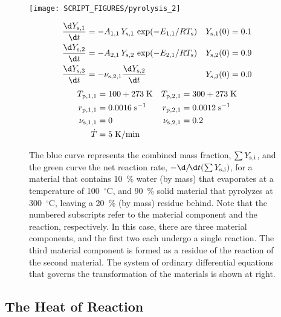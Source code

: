 \documentclass[11pt]{book}
\begin{document}
\begin{figure}[ht]
\noindent
\begin{minipage}{0.5\textwidth}
\texttt{[image: SCRIPT\_FIGURES/pyrolysis\_2]}
\end{minipage}
\hfill
\begin{minipage}{0.5\textwidth}
\footnotesize
\begin{align*}
   \frac{\d Y_{\rm s,1}}{\d t} &= -A_{1,1} \, Y_{\rm s,1} \, \exp(-E_{1,1}/RT_{\rm s})                  & Y_{\rm s,1}(0) &=0.1 \\
   \frac{\d Y_{\rm s,2}}{\d t} &= -A_{2,1} \, Y_{\rm s,2} \, \exp(-E_{2,1}/RT_{\rm s})                  & Y_{\rm s,2}(0) &=0.9 \\
   \frac{\d Y_{\rm s,3}}{\d t} &= -\nu_{{\rm s},2,1} \frac{\d Y_{\rm s,2}}{\d t}                        & Y_{\rm s,3}(0) &=0.0
\end{align*}
\begin{align*}
   T_{{\rm p},1,1} &= 100+273 \; \mathrm{K}        & T_{{\rm p},2,1}   &= 300+273 \; \mathrm{K} \\
   r_{{\rm p},1,1} &= 0.0016 \; \mathrm{s}^{-1}           & r_{{\rm p},2,1}   &= 0.0012 \; \mathrm{s}^{-1} \\
   \nu_{{\rm s},1,1} &= 0                          & \nu_{{\rm s},2,1} &= 0.2 \\
   \dot{T} &= 5 \; \mathrm{K/min} & &
\end{align*}
\end{minipage} \normalsize
\caption[A more complicated demonstration of the pyrolysis model]{The blue curve represents the combined mass fraction, $\sum Y_{\rm s,i}$, and the green curve the net reaction rate, $-\d/\!\d t(\sum Y_{\rm s,i})$, for a material that contains 10~\% water (by mass) that evaporates at a temperature of 100~$^\circ$C, and 90~\% solid material that pyrolyzes at 300~$^\circ$C, leaving a 20~\% (by mass) residue behind. Note that the numbered subscripts refer to the material component and the reaction, respectively. In this case, there are three material components, and the first two each undergo a single reaction. The third material component is formed as a residue of the reaction of the second material.
The system of ordinary differential equations that governs the transformation of the materials is shown at right.}
\label{pyrolysis_2}
\end{figure}




\subsection{The Heat of Reaction}
\end{document}
